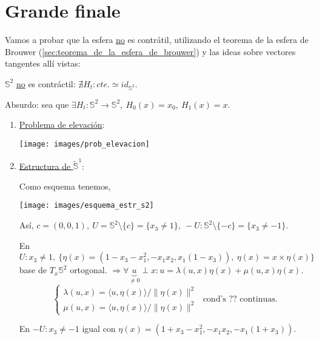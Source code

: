 \chapter{Grande finale}%
\label{cha:grande_finale}
Vamos a probar que la esfera \underline{no} es contrátil, utilizando el teorema de la esfera de Brouwer (\ref{sec:teorema_de_la_esfera_de_brouwer}) y las ideas sobre vectores tangentes allí vistas:
\begin{prop}
$\mathbb{S}^{2}$ \underline{no} es contráctil: $\nexists H_t: cte. \simeq id_{\mathbb{S}^{2}}$.
\end{prop}
\begin{demo}
Absurdo: sea que $\exists H_t: \mathbb{S}^{2} \rightarrow \mathbb{S}^{2},\ H_0\left( x \right) = x_0,\ H_1\left( x \right) = x$.
\begin{enumerate}
    \item \underline{Problema de elevación}:
    \begin{center}
        \texttt{[image: images/prob\_elevacion]} 
    \end{center}

    \item \underline{Estructura de }$\tilde{\mathbb{S}}^1$: 

    Como esquema tenemos,
    \begin{center}
        \texttt{[image: images/esquema\_estr\_s2]} 
    \end{center}
    Así,
        $c = \left( 0, 0, 1 \right),\ U = \mathbb{S}^{2} \setminus \{c\} = \{x_3 \neq 1\},\ -U : \mathbb{S}^{2} \setminus \{-c\} = \{x_3 \neq -1\}$.

    En $U: x_3 \neq 1,\ \{\eta\left( x \right) = \left( 1 - x_3 - x_1^2, -x_1x_2, x_1\left( 1- x_3 \right) \right),\ \eta\left( x \right) = x \times \eta\left( x \right)\}$ base de $T_x\mathbb{S}^{2}$ ortogonal. $\Rightarrow \forall \underbrace{u}_{\neq 0} \perp x: u = \lambda\left( u, x \right) \eta\left( x \right) + \mu\left( u, x \right) \eta\left( x \right)$.
    \[
    \begin{cases}
        \lambda\left( u, x \right) = \langle u, \eta\left( x \right) \rangle / \lVert \eta\left( x \right) \rVert^2\\
        \mu\left( u, x \right) = \langle u, \eta\left( x \right) \rangle / \lVert \eta\left( x \right) \rVert^2
    \end{cases} \text{ cond's ?? continuas.} 
    \]

    En $-U : x_3\neq -1$ igual con $\eta\left( x \right) = \left( 1 + x_3 - x_1^2, -x_1x_2, -x_1\left( 1 + x_3 \right) \right)$.


\end{enumerate}
\end{demo}
